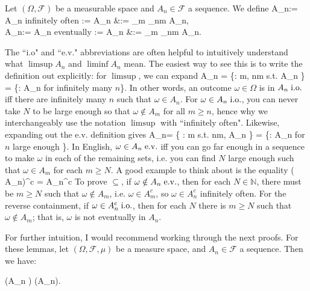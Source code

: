 \begin{definition}[$\limsup$, $\liminf$]
	Let $(\Omega, \mathcal F)$ be a measurable space and $A_n\in\mathcal F$ a sequence. We define
	\eq
		A_n\io := A_n\textnormal{ infinitely often} := \limsup A_n &:= \bigcap_{m} \bigcup_{n\geq m} A_n, \\
		A_n\ev := A_n\textnormal{ eventually} := \liminf A_n &:= \bigcup_{m} \bigcap_{n\geq m} A_n.
	\qe
\end{definition}

The ``i.o" and ``e.v." abbreviations are often helpful to intuitively understand what $\limsup A_n$ and $\liminf A_n$ mean. The easiest way to see this is to write the definition out explicitly: for $\limsup$, we can expand
\eq
	A_n \io = \left\{\omega\in\Omega : \forall m, \exists n\geq m\textnormal{ s.t. } \omega\in A_n \right\} = \left\{\omega\in\Omega : \omega\in A_n\textnormal{ for infinitely many $n$}\right\}.
\qe
In other words, an outcome $\omega\in\Omega$ is in $A_n\;\mathrm{i.o.}$ iff there are infinitely many $n$ such that $\omega\in A_n$. For $\omega\in A_n\;\mathrm{i.o.}$, you can never take $N$ to be large enough so that $\omega\notin A_m$ for all $m\geq n$, hence why we interchangeably use the notation $\limsup$ with ``infinitely often". Likewise, expanding out the e.v. definition gives
\eq
	A_n\ev = \left\{ \omega\in\Omega : \exists m\textnormal{ s.t. } \forall n\geq m, \omega\in A_n \right\} = \left\{\omega\in\Omega : \omega\in A_n\textnormal{ for $n$ large enough} \right\}.
\qe
In English, $\omega\in A_n\;\mathrm{e.v.}$ iff you can go far enough in a sequence to make $\omega$ in each of the remaining sets, i.e. you can find $N$ large enough such that $\omega\in A_m$ for each $m\geq N$. A good example to think about is the equality
\eq
	\left( A_n\ev \right)^c = A_n^c\io
\qe
To prove $\subseteq$, if $\omega\notin A_n\;\mathrm{e.v.}$, then for each $N\in\mathbb N$, there must be $m\geq N$ such that $\omega\notin A_m$, i.e. $\omega\in A_m^c$, so $\omega\in A_n^c$ infinitely often. For the reverse containment, if $\omega\in A_n^c\;\mathrm{i.o.}$, then for each $N$ there is $m\geq N$ such that $\omega\notin A_m$; that is, $\omega$ is not eventually in $A_n$. 

For further intuition, I would recommend working through the next proofs. For these lemmas, let $(\Omega, \mathcal F, \mu)$ be a measure space, and $A_n\in \mathcal F$ a sequence. Then we have:

\begin{lemma}
	\eq
		\mu\left(\liminf A_n \right) \leq \liminf \mu(A_n).
	\qe
\end{lemma}


